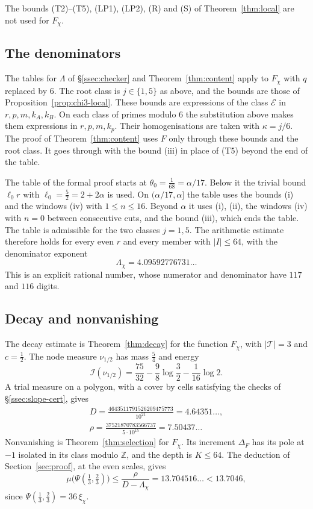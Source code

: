 \documentclass[11pt]{amsart}
\theoremstyle{definition}
\theoremstyle{remark}
\numberwithin{equation}{section}
\newcommand{\Z}{\mathbb Z}
\newcommand{\cI}{\mathcal I}
\newcommand{\MuChi}{13.7046}
\newcommand{\MuChiExact}{13.704516}
\begin{document}
The bounds (T2)--(T5), (LP1), (LP2), (R) and (S) of Theorem~\ref{thm:local} are not used for $F_\chi$.

\subsection{The denominators}
The tables for $\Lambda$ of \S\ref{ssec:checker} and Theorem~\ref{thm:content} apply to $F_\chi$ with $q$ replaced by $6$. The root
class is $j\in\{1,5\}$ as above, and the bounds are those of Proposition~\ref{prop:chi3-local}. These bounds are
expressions of the class $\mathcal E$ in $r,p,m,k_A,k_B$. On each class of primes modulo $6$ the substitution above makes
them expressions in $r,p,m,k_p$. Their homogenisations are taken with $\kappa=j/6$. The proof of
Theorem~\ref{thm:content} uses $F$ only through these bounds and the root class. It goes through with the bound
(iii) in place of (T5) beyond the end of the table.

The table of the formal proof starts at $\theta_0=\frac1{68}=\alpha/17$. Below it the trivial bound $\ell_0r$ with
$\ell_0=\frac52=2+2\alpha$ is used. On $(\alpha/17,\alpha]$ the table uses the bounds (i) and the windows (iv) with
$1\le n\le16$. Beyond $\alpha$ it uses (i), (ii), the windows (iv) with $n=0$ between consecutive cuts, and the bound
(iii), which ends the table. The table is admissible for the two classes $j=1,5$. The arithmetic estimate therefore
holds for every even $r$ and every member with $|I|\le64$, with the denominator exponent
\[
 \Lambda_\chi=4.09592776731\ldots
\]
This is an explicit rational number, whose numerator and denominator have $117$ and $116$ digits.

\subsection{Decay and nonvanishing}
The decay estimate is Theorem~\ref{thm:decay} for the function $F_\chi$, with $|\mathcal T|=3$ and $c=\frac12$. The node
measure $\nu_{1/2}$ has mass $\frac54$ and energy
\[
 \cI(\nu_{1/2})=\frac{75}{32}-\frac98\log\frac32-\frac1{16}\log2 .
\]
A trial measure on a polygon, with a cover by cells satisfying the checks of \S\ref{ssec:slope-cert}, gives
\[
\begin{gathered}
 D=\frac{4643511791526209475773}{10^{21}}=4.64351\ldots,\\ \rho=\frac{37521870783566737}{5\cdot10^{15}}=7.50437\ldots
\end{gathered}
\]
Nonvanishing is Theorem~\ref{thm:selection} for $F_\chi$. Its increment $\Delta_F$ has its pole at $-1$ isolated in its
class modulo $\Z$, and the depth is $K\le64$. The deduction of Section~\ref{sec:proof}, at the even scales, gives
\[
 \mu\bigl(\Psi(\tfrac13,\tfrac23)\bigr)\le\frac\rho{D-\Lambda_\chi}=\MuChiExact\ldots<\MuChi,
\]
since $\Psi(\frac13,\frac23)=36\,\xi_\chi$.
\end{document}
